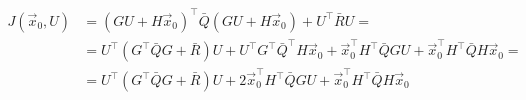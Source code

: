 \documentclass{article}
\begin{document}
\thispagestyle{empty}

\begin{align*}
J(\vec{x}_0, U) & = (GU + H\vec{x}_0)^\top\bar{Q}(GU + H\vec{x}_0)+U^\top\bar{R}U=\\
& = U^\top(G^\top\bar{Q}G + \bar{R})U + U^\top G^\top \bar{Q}^\top H\vec{x}_0 + \vec{x}_0^\top H^\top \bar{Q} G U + \vec{x}_0^\top H^\top \bar{Q} H \vec{x}_0 = \\
& = U^\top(G^\top\bar{Q}G + \bar{R})U + 2 \vec{x}_0^\top H^\top \bar{Q} G U + \vec{x}_0^\top H^\top \bar{Q} H \vec{x}_0 
\end{align*}
\end{document}
